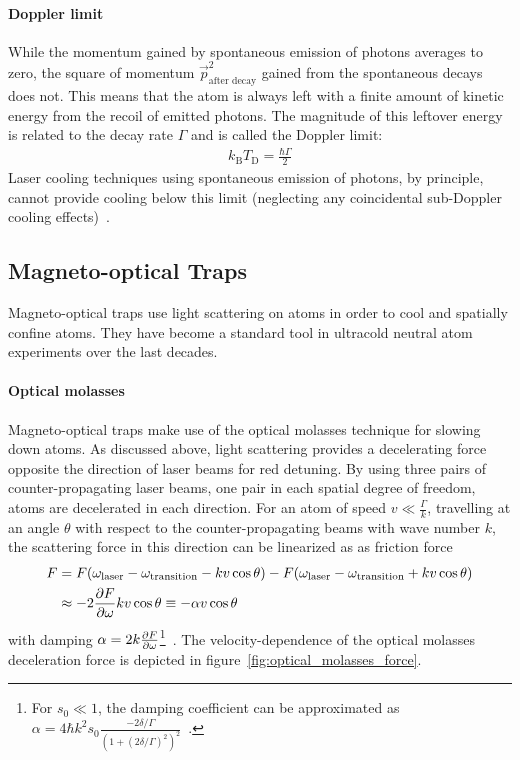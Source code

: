 \paragraph*{Doppler limit} While the momentum gained by spontaneous emission of photons averages to zero, the square of momentum $\vec p_\text{after decay}^2$ gained from the spontaneous decays does not. This means that the atom is always left with a finite amount of kinetic energy from the recoil of emitted photons. The magnitude of this leftover energy is related to the decay rate $\Gamma$ and is called the Doppler limit:
\begin{align}
    k_\text{B} T_\text{D} = \frac{\hbar \Gamma}{2}
\end{align}
Laser cooling techniques using spontaneous emission of photons, by principle, cannot provide cooling below this limit (neglecting any coincidental sub-Doppler cooling effects)~\cite{foot_atomic_2005}.


\subsection*{Magneto-optical Traps}
Magneto-optical traps use light scattering on atoms in order to cool and spatially confine atoms. They have become a standard tool in ultracold neutral atom experiments over the last decades.

\paragraph{Optical molasses} Magneto-optical traps make use of the optical molasses technique for slowing down atoms. As discussed above, light scattering provides a decelerating force opposite the direction of laser beams for red detuning. By using three pairs of counter-propagating laser beams, one pair in each spatial degree of freedom, atoms are decelerated in each direction. For an atom of speed $v \ll \frac{\Gamma}{k}$, travelling at an angle $\theta$ with respect to the  counter-propagating beams with wave number $k$, the scattering force in this direction can be linearized as as friction force
\begin{equation}
    \begin{split}
        F &= F(\omega_\text{laser} - \omega_\text{transition} - kv \cos \theta) - F(\omega_\text{laser} - \omega_\text{transition} + kv \cos \theta) \\
        &\approx - 2 \pdv{F}{\omega} k v \cos \theta \equiv -\alpha v \cos \theta
    \end{split}
\end{equation}
with damping $\alpha = 2k \pdv{F}{\omega}$\footnote{For $s_0 \ll 1$, the damping coefficient can be approximated as $\alpha  = 4 \hbar k^2 s_0 \frac{-2\delta/\Gamma}{{\left(1+{{(2\delta/\Gamma)}}^2\right)}^2}$~\cite{foot_atomic_2005}.}~\cite{foot_atomic_2005}. The velocity-dependence of the optical molasses deceleration force is depicted in figure~\ref{fig:optical_molasses_force}.

